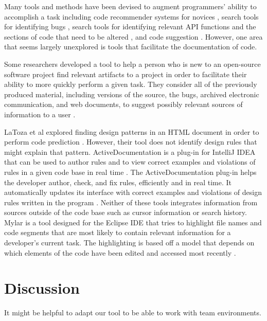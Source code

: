\documentclass[12pt]{article}
\begin{document}
Many tools and methods have been devised to augment programmers' ability to accomplish a task including code recommender systems for novices \cite{HartmannEtAl2010}, search tools for identifying bugs \cite{HovemeyerPugh2004}, search tools for identifying relevant API functions and the sections of code that need to be altered \cite{RongEtAl2016}, and code suggestion \cite{RaychevEtAl2014}. However, one area that seems largely unexplored is tools that facilitate the documentation of code.

Some researchers developed a tool to help a person who is new to an open-source software project find relevant artifacts to a project in order to facilitate their ability to more quickly perform a given task. They consider all of the previously produced material, including versions of the source, the bugs, archived electronic communication, and web documents, to suggest possibly relevant sources of information to a user \cite{CubranicMurphy2003}.

LaToza et al explored finding design patterns in an HTML document in order to perform code prediction \cite{LaTozaEtAl2019}. However, their tool does not identify design rules that might explain that pattern. 
ActiveDocumentation is a plug-in for IntelliJ IDEA that can be used to author rules and to view correct examples and violations of rules in a given code base in real time \cite{MehrpurEtAl2019}. The ActiveDocumentation plug-in helps the developer author, check, and fix rules, efficiently and in real time. It automatically updates its interface with correct examples and violations of design rules written in the program \cite{MehrpurEtAl2019}. Neither of these tools integrates information from sources outside of the code base such as cursor information or search history. Mylar is a tool designed for the Eclipse IDE that tries to highlight file names and code segments that are most likely to contain relevant information for a developer's current task. The highlighting is based off a model that depends on which elements of the code have been edited and accessed most recently \cite{KerstenMurphy2005}.




\clearpage

\section{Discussion}\label{disc}

It might be helpful to adapt our tool to be able to work with team environments. 
\end{document}
